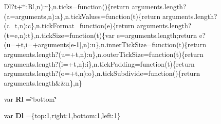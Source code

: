 \begin{DoxyCompactItemize}
$$Dl?t+\char`\"{}\char`\"{}\+:\+Rl,n)\+:r\},n.\+ticks=function()\{return arguments.\+length?(a=arguments,n)\+:a\},n.\+tick\+Values=function(t)\{return arguments.\+length?(c=t,n)\+:c\},n.\+tick\+Format=function(e)\{return arguments.\+length?(t=e,n)\+:t\},n.\+tick\+Size=function(t)\{var e=arguments.\+length;return e?(u=+t,i=+arguments[e-\/1],n)\+:u\},n.\+inner\+Tick\+Size=function(t)\{return arguments.\+length?(u=+t,n)\+:u\},n.\+outer\+Tick\+Size=function(t)\{return arguments.\+length?(i=+t,n)\+:i\},n.\+tick\+Padding=function(t)\{return arguments.\+length?(o=+t,n)\+:o\},n.\+tick\+Subdivide=function()\{return arguments.\+length\&\&n\},n\}
\item 
var {\bf Rl} =\char`\"{}bottom\char`\"{}
\item 
var {\bf Dl} =\{top\+:1,right\+:1,bottom\+:1,left\+:1\}
\item 

\end{DoxyCompactItemize}
